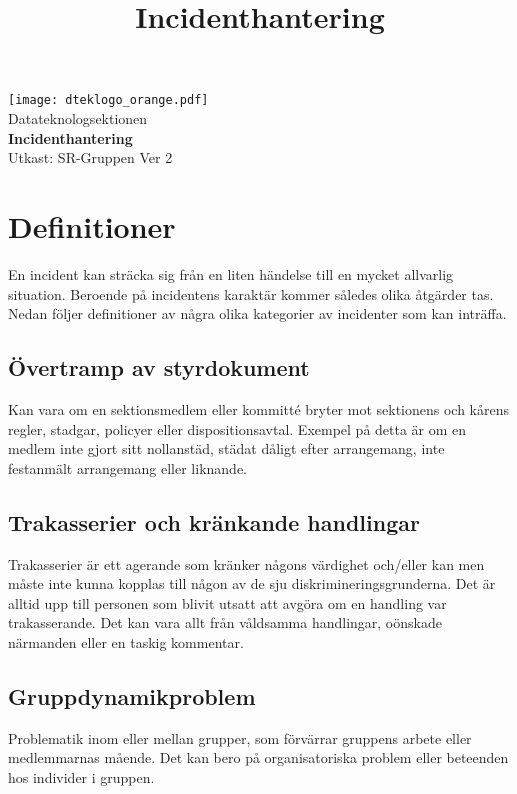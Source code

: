 \documentclass[a4paper]{dtek}
\title{Incidenthantering}
\begin{document}
\begin{titlepage}
    \thispagestyle{empty} %
    \vspace*{1cm}
    \begin{center}
      \texttt{[image: dteklogo\_orange.pdf]}\\[3em]
      {\Huge Datateknologsektionen}\\[3em]
      {\Huge \textbf{Incidenthantering}}\\[1em]
      Utkast: SR-Gruppen Ver 2
    \end{center}
  \end{titlepage}

  \makeheadfoot

  \tableofcontents
\newpage
\section{Definitioner}
En incident kan sträcka sig från en liten händelse till en mycket allvarlig situation. Beroende på incidentens karaktär kommer således olika åtgärder tas. Nedan följer definitioner av några olika kategorier av incidenter som kan inträffa.

\subsection{Övertramp av styrdokument}
Kan vara om en sektionsmedlem eller kommitté bryter mot sektionens och kårens regler, stadgar, policyer eller dispositionsavtal. Exempel på detta är om en medlem inte gjort sitt nollanstäd, städat dåligt efter arrangemang, inte festanmält arrangemang eller liknande.

\subsection{Trakasserier och kränkande handlingar}
Trakasserier är ett agerande som kränker någons värdighet och/eller kan men måste inte kunna kopplas till någon av de sju diskrimineringsgrunderna. Det är alltid upp till personen som blivit utsatt att avgöra om en handling var trakasserande. Det kan vara allt från våldsamma handlingar, oönskade närmanden eller en taskig kommentar. 

\subsection{Gruppdynamikproblem}
Problematik inom eller mellan grupper, som förvärrar gruppens arbete eller medlemmarnas mående. Det kan bero på organisatoriska problem eller beteenden hos individer i gruppen.
\end{document}
